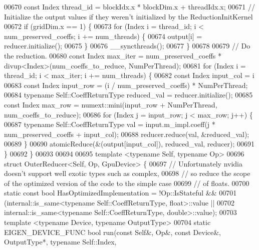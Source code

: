 \begin{DoxyCode}
00670   \textcolor{keyword}{const} Index thread\_id = blockIdx.x * blockDim.x + threadIdx.x;
00671   \textcolor{comment}{// Initialize the output values if they weren't initialized by the ReductionInitKernel}
00672   \textcolor{keywordflow}{if} (gridDim.x == 1) \{
00673     \textcolor{keywordflow}{for} (Index i = thread\_id; i < num\_preserved\_coeffs; i += num\_threads) \{
00674       output[i] = reducer.initialize();
00675     \}
00676     \_\_syncthreads();
00677   \}
00678 
00679   \textcolor{comment}{// Do the reduction.}
00680   \textcolor{keyword}{const} Index max\_iter = num\_preserved\_coeffs * divup<Index>(num\_coeffs\_to\_reduce, NumPerThread);
00681   \textcolor{keywordflow}{for} (Index i = thread\_id; i < max\_iter; i += num\_threads) \{
00682     \textcolor{keyword}{const} Index input\_col = i %
00683     \textcolor{keyword}{const} Index input\_row = (i / num\_preserved\_coeffs) * NumPerThread;
00684     \textcolor{keyword}{typename} Self::CoeffReturnType reduced\_val = reducer.initialize();
00685     \textcolor{keyword}{const} Index max\_row = numext::mini(input\_row + NumPerThread, num\_coeffs\_to\_reduce);
00686     \textcolor{keywordflow}{for} (Index j = input\_row; j < max\_row; j++) \{
00687       \textcolor{keyword}{typename} Self::CoeffReturnType val = input.m\_impl.coeff(j * num\_preserved\_coeffs + input\_col);
00688       reducer.reduce(val, &reduced\_val);
00689     \}
00690     atomicReduce(&(output[input\_col]), reduced\_val, reducer);
00691   \}
00692 \}
00693 
00694 
00695 \textcolor{keyword}{template} <\textcolor{keyword}{typename} Self, \textcolor{keyword}{typename} Op>
00696 \textcolor{keyword}{struct }OuterReducer<Self, Op, GpuDevice> \{
00697   \textcolor{comment}{// Unfortunately nvidia doesn't support well exotic types such as complex,}
00698   \textcolor{comment}{// so reduce the scope of the optimized version of the code to the simple case}
00699   \textcolor{comment}{// of floats.}
00700   \textcolor{keyword}{static} \textcolor{keyword}{const} \textcolor{keywordtype}{bool} HasOptimizedImplementation = !Op::IsStateful &&
00701                                                  (internal::is\_same<typename Self::CoeffReturnType,
       float>::value ||
00702                                                   internal::is\_same<typename Self::CoeffReturnType,
       double>::value);
00703   \textcolor{keyword}{template} <\textcolor{keyword}{typename} Device, \textcolor{keyword}{typename} OutputType>
00704   \textcolor{keyword}{static} EIGEN\_DEVICE\_FUNC \textcolor{keywordtype}{bool} run(\textcolor{keyword}{const} Self&, Op&, \textcolor{keyword}{const} Device&, OutputType*, \textcolor{keyword}{typename} Self::Index, \textcolor{keyword}{
}
\end{DoxyCode}

